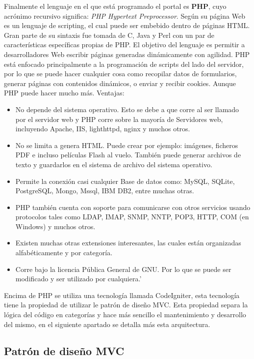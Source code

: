 Finalmente el lenguaje en el que está programado el portal es \textbf{PHP}, cuyo acrónimo recursivo significa: \emph{PHP Hypertext Preprocessor}. Según su página Web \cite{phpWeb} es un lenguaje de scripting, el cual puede ser embebido dentro de páginas HTML. Gran parte de su sintaxis fue tomada de C, Java y Perl con un par de características específicas propias de PHP. El objetivo del lenguaje es permitir a desarrolladores Web escribir páginas generadas dinámicamente con agilidad.
PHP está enfocado principalmente a la programación de scripts del lado del servidor, por lo que se puede hacer cualquier cosa como recopilar datos de formularios, generar páginas con contenidos dinámicos, o enviar y recibir cookies. Aunque PHP puede hacer mucho más.
				 Ventajas:
	\begin{itemize}
		\item No depende del sistema operativo. Esto se debe a que corre al ser llamado por el servidor web y PHP corre sobre la mayoría de Servidores web, incluyendo Apache, IIS, lighthttpd, nginx y muchos otros.
		\item No se limita a genera HTML. Puede crear por ejemplo: imágenes, ficheros PDF e incluso películas Flash al vuelo. También puede generar archivos de texto y guardarlos en el sistema de archivo del sistema operativo.
		\item Permite la conexión casi cualquier Base de datos como: MySQL, SQLite, PostgreSQL, Mongo, Mssql, IBM DB2, entre muchas otras.
		\item PHP también cuenta con soporte para comunicarse con otros servicios usando protocolos tales como LDAP, IMAP, SNMP, NNTP, POP3, HTTP, COM (en Windows) y muchos otros.
		\item Existen muchas otras extensiones interesantes, las cuales están organizadas alfabéticamente y por categoría.
		\item Corre bajo la licencia Pública General de GNU. Por lo que se puede ser modificado y ser utilizado por cualquiera.'
	\end{itemize}

Encima de PHP se utiliza una tecnología llamada CodeIgniter, esta tecnología tiene la propiedad de utilizar le patrón de diseño MVC. Esta propiedad separa la lógica del código en categorías y hace más sencillo el mantenimiento y desarrollo del mismo, en el siguiente apartado se detalla más esta arquitectura.

\subsection{Patrón de diseño MVC}

